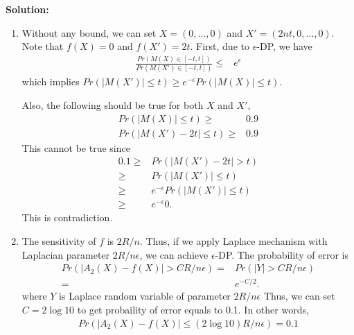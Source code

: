 \documentclass[12pt]{article}
\begin{document}
\begin{enumerate}
\begin{solution}
{\bf Solution:}\\
\begin{enumerate}
\item Without any bound, we can set $X = (0, \dots, 0)$ and $X' = (2nt, 0, \dots, 0)$.
Note that $f(X) = 0$ and $f(X') = 2t$.
First, due to $\epsilon$-DP, we have
\begin{align*}
    \frac{Pr(M(X) \in [-t, t])}{Pr(M(X')\in [-t, t])} \leq&  e^\epsilon
\end{align*}
which implies $Pr(|M(X')|\leq t) \geq e^{-\epsilon} Pr(|M(X)|\leq t)$.

Also, the following should be true for both $X$ and $X'$,
\begin{align*}
    Pr(|M(X) | \leq t) \geq&  0.9\\
    Pr(|M(X') - 2t| \leq t) \geq&  0.9
\end{align*}
This cannot be true since
\begin{align*}
    0.1 \geq& Pr(|M(X')-2t| > t)\\
        \geq& Pr(|M(X')| \leq t)\\
        \geq & e^{-\epsilon}Pr(|M(X')| \leq t)\\
        \geq & e^{-\epsilon} 0.
\end{align*}
This is contradiction.

\item The sensitivity of $f$ is $2R/n$.
Thus, if we apply Laplace mechanism with Laplacian parameter $2R/n\epsilon$, we can achieve $\epsilon$-DP.
The probability of error is
\begin{align*}
    Pr(|A_2(X) - f(X)| > CR/n\epsilon) =& Pr (|Y| > CR/n\epsilon)\\
    =& e^{-C/2}.
\end{align*}
where $Y$ is Laplace random variable of parameter $2R/n\epsilon$
Thus, we can set $C = 2 \log 10$ to get probaility of error equals to 0.1.
In other words,
\begin{align*}
    Pr(|A_2(X) - f(X)| \leq (2\log 10) R/n\epsilon) =0.1
\end{align*}
\end{enumerate}
\end{solution}




\end{enumerate}
\end{document}
